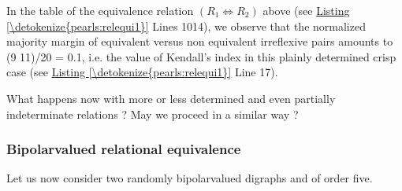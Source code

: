 \documentclass[a4paper,12pt,english]{sphinxhowto}
\begin{document}
\sphinxAtStartPar
In the table of the equivalence relation \((R_1 \Leftrightarrow R_2)\) above (see \hyperref[\detokenize{pearls:relequi1}]{Listing \ref{\detokenize{pearls:relequi1}}} Lines 10\sphinxhyphen{}14), we observe that the normalized majority margin of equivalent versus non equivalent irreflexive pairs amounts to (9 \sphinxhyphen{} 11)/20 = \sphinxhyphen{}0.1, i.e. the value of Kendall’s  index in this plainly determined crisp case (see \hyperref[\detokenize{pearls:relequi1}]{Listing \ref{\detokenize{pearls:relequi1}}} Line 17).

\sphinxAtStartPar
What happens now with more or less determined and even partially indeterminate relations ? May we proceed in a similar way ?


\subsubsection{Bipolar\sphinxhyphen{}valued relational equivalence}
\label{\detokenize{pearls:bipolar-valued-relational-equivalence}}
\sphinxAtStartPar
Let us now consider two randomly bipolar\sphinxhyphen{}valued digraphs  and  of order five.
\def\sphinxLiteralBlockLabel{\label{\detokenize{pearls:tworand}}}
%
\end{document}
